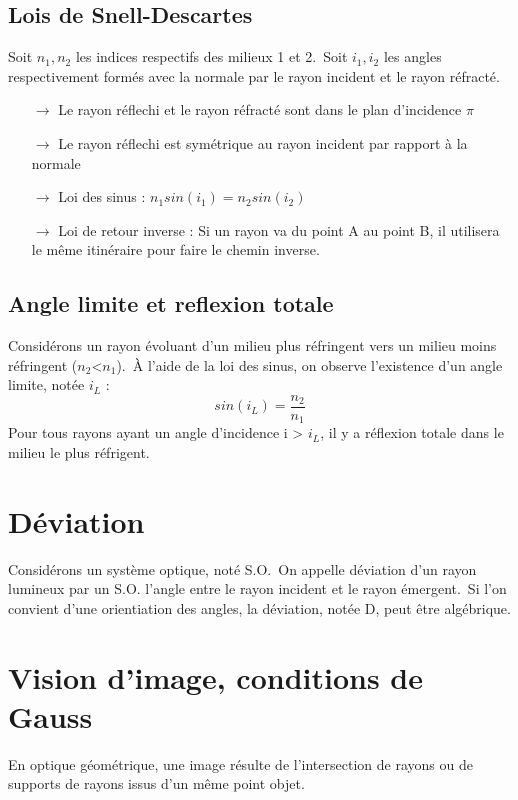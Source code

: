 \subsection{Lois de Snell-Descartes}

Soit $n_1,n_2$ les indices respectifs des milieux 1 et 2.\
Soit $i_1,i_2$ les angles respectivement formés avec la normale par le rayon incident et le rayon réfracté.
\begin{itemize}
 \item[$\rightarrow$] Le rayon réflechi et le rayon réfracté sont dans le plan d'incidence $\pi$
 \item[$\rightarrow$] Le rayon réflechi est symétrique au rayon incident par rapport à la normale
 \item[$\rightarrow$] Loi des sinus : $n_1sin(i_1)=n_2sin(i_2)$
\item[$\rightarrow$] Loi de retour inverse : Si un rayon va du point A au point B, il utilisera le même itinéraire pour faire le chemin inverse.
\end{itemize}

\subsection{Angle limite et reflexion totale}

Considérons un rayon évoluant d'un milieu plus réfringent vers un milieu moins réfringent ($n_2$<$n_1$).\
À l'aide de la loi des sinus, on observe l'existence d'un angle limite, notée $i_L$ :
$$sin(i_L) = \dfrac{n_2}{n_1}$$
Pour tous rayons ayant un angle d'incidence i > $i_L$, il y a réflexion totale dans le milieu le plus réfrigent.

\section{Déviation}

\begin{de}
Considérons un système optique, noté S.O.\
On appelle déviation d'un rayon lumineux par un S.O. l'angle entre le rayon incident et le rayon émergent.\
Si l'on convient d'une orientiation des angles, la déviation, notée D, peut être algébrique.
\end{de}

\section{Vision d'image, conditions de Gauss}

\begin{de}
En optique géométrique, une image résulte de l'intersection de rayons ou de supports de rayons issus d'un même point objet.
\end{de}

